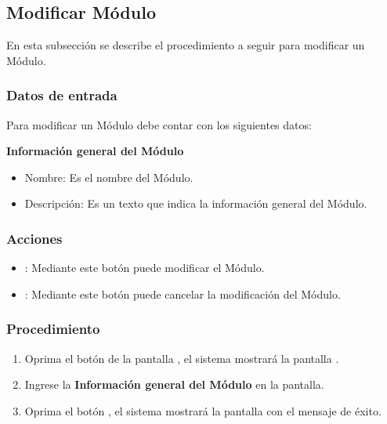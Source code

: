 \subsection{Modificar Módulo}

En esta subsección se describe el procedimiento a seguir para modificar un Módulo.


\subsubsection{Datos de entrada}
\begin{description}
	\item Para modificar un Módulo debe contar con los siguientes datos: \hspace{10pt}
	
	\begin{description}
	    \item \textbf{Información general del Módulo}
	    \begin{itemize}
		  \item Nombre: Es el nombre del Módulo.
		  \item Descripción: Es un texto que indica la información general del Módulo.
	    \end{itemize}
	 \end{description}
\end{description}

\subsubsection{Acciones}
\begin{itemize}
  \item {}: Mediante este botón puede modificar el Módulo.
  \item {}: Mediante este botón puede cancelar la modificación del Módulo.
\end{itemize}

\subsubsection{Procedimiento}
\begin{enumerate}
	\item Oprima el botón \btnEditar de la pantalla , el sistema mostrará la pantalla . 

	
	\item Ingrese la \textbf{Información general del Módulo} en la pantalla.
	
	\item Oprima el botón , el sistema mostrará la pantalla  con el mensaje de éxito.
\end{enumerate}

